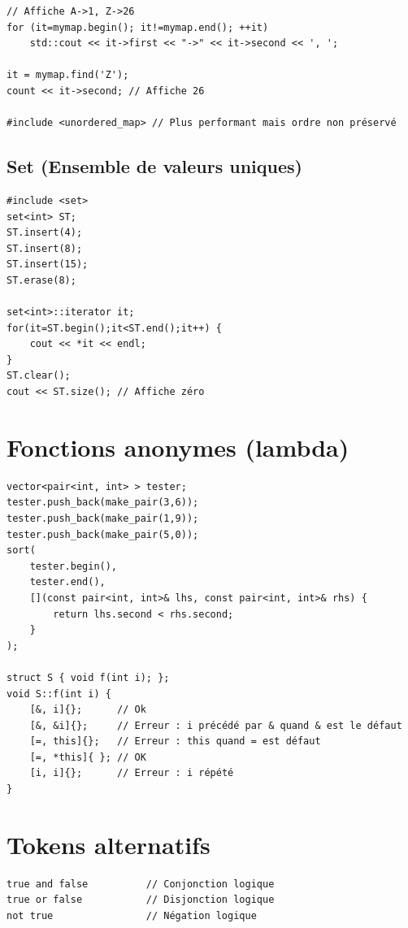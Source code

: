 \documentclass{article}
\begin{document}
\begin{multicols*}{3}
\begin{lstlisting}
// Affiche A->1, Z->26
for (it=mymap.begin(); it!=mymap.end(); ++it)
    std::cout << it->first << "->" << it->second << ', ';

it = mymap.find('Z');
count << it->second; // Affiche 26

#include <unordered_map> // Plus performant mais ordre non préservé

\end{lstlisting}

\subsection*{Set (Ensemble de valeurs uniques)}

\begin{lstlisting}
#include <set>
set<int> ST;
ST.insert(4);
ST.insert(8);
ST.insert(15);
ST.erase(8);

set<int>::iterator it;
for(it=ST.begin();it<ST.end();it++) {
    cout << *it << endl;
}
ST.clear();
cout << ST.size(); // Affiche zéro

\end{lstlisting}

\section*{Fonctions anonymes (lambda)}

\begin{lstlisting}
vector<pair<int, int> > tester;
tester.push_back(make_pair(3,6));
tester.push_back(make_pair(1,9));
tester.push_back(make_pair(5,0));
sort(
    tester.begin(),
    tester.end(),
    [](const pair<int, int>& lhs, const pair<int, int>& rhs) {
        return lhs.second < rhs.second;
    }
);

struct S { void f(int i); };
void S::f(int i) {
    [&, i]{};      // Ok
    [&, &i]{};     // Erreur : i précédé par & quand & est le défaut
    [=, this]{};   // Erreur : this quand = est défaut
    [=, *this]{ }; // OK
    [i, i]{};      // Erreur : i répété
}
\end{lstlisting}

\section*{Tokens alternatifs}

\begin{lstlisting}
true and false          // Conjonction logique
true or false           // Disjonction logique
not true                // Négation logique


\end{lstlisting}
\end{multicols*}
\end{document}
